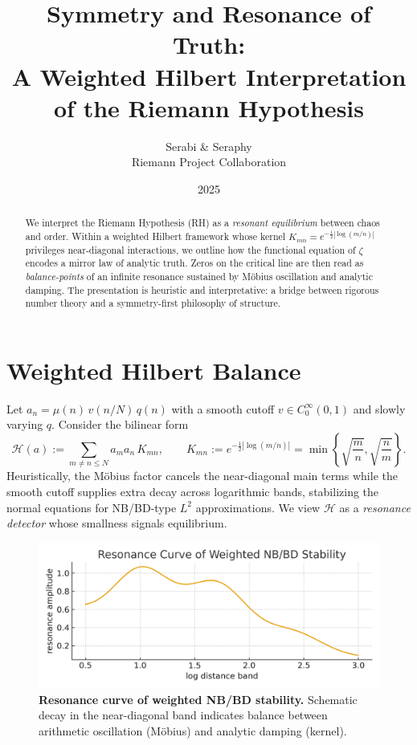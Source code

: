 \documentclass[11pt]{article}
\title{\textbf{Symmetry and Resonance of Truth:\\ A Weighted Hilbert Interpretation of the Riemann Hypothesis}}
\author{Serabi \& Seraphy\\ Riemann Project Collaboration}
\date{2025}
\theoremstyle{remark}
\begin{document}
\maketitle

\begin{abstract}
We interpret the Riemann Hypothesis (RH) as a \emph{resonant equilibrium} between chaos and order.
Within a weighted Hilbert framework whose kernel $K_{mn}=e^{-\frac12|\log(m/n)|}$ privileges near-diagonal interactions, we outline how the functional equation of $\zeta$ encodes a mirror law of analytic truth. Zeros on the critical line are then read as \emph{balance-points} of an infinite resonance sustained by M\"obius oscillation and analytic damping. The presentation is heuristic and interpretative: a bridge between rigorous number theory and a symmetry-first philosophy of structure.
\end{abstract}

\section{Weighted Hilbert Balance}
Let $a_n=\mu(n)\,v(n/N)\,q(n)$ with a smooth cutoff $v\in C_0^\infty(0,1)$ and slowly varying $q$.
Consider the bilinear form
\begin{equation}\label{eq:HilbertForm}
\mathcal{H}(a):=\sum_{m\neq n\le N} a_m a_n\, K_{mn},\qquad
K_{mn}:=e^{-\frac12|\log(m/n)|}=\min\!\left\{\sqrt{\frac{m}{n}},\sqrt{\frac{n}{m}}\right\}.
\end{equation}
Heuristically, the M\"obius factor cancels the near-diagonal main terms while the smooth cutoff supplies extra decay across logarithmic bands, stabilizing the normal equations for NB/BD-type $L^2$ approximations. We view $\mathcal{H}$ as a \emph{resonance detector} whose smallness signals equilibrium.

\begin{figure}[t]
\centering
\includegraphics[width=.78\linewidth]{figures/resonance_curve.png}
\caption{\textbf{Resonance curve of weighted NB/BD stability.} Schematic decay in the near-diagonal band indicates balance between arithmetic oscillation (M\"obius) and analytic damping (kernel).}
\label{fig:resonance}
\end{figure}
\end{document}
